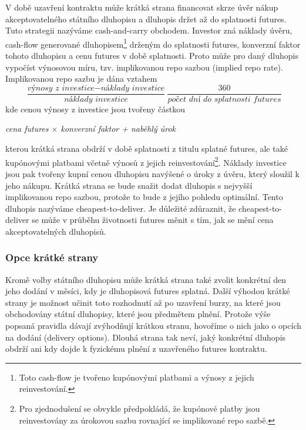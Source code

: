 \documentclass[a4paper]{book}
\begin{document}
V době uzavření kontraktu může krátká strana financovat skrze úvěr nákup akceptovatelného státního dluhopisu a dluhopis držet až do splatnosti futures. Tuto strategii nazýváme cash-and-carry obchodem. Investor zná náklady úvěru, cash-flow generované dluhopisem\footnote{Toto cash-flow je tvořeno kupónovými platbami a výnosy z jejich reinvestování.} drženým do splatnosti futures, konverzní faktor tohoto dluhopisu a cenu futures v době splatnosti. Proto může pro daný dluhopis vypočíst výnosovou míru, tzv. implikovanou repo sazbou (implied repo rate). Implikovanou repo sazbu je dána vztahem
\begin{equation*}
\frac{\textit{v\'{y}nosy z investice} - \textit{n\'{a}klady investice}}{\textit{n\'{a}klady investice}} \frac{360}{\textit{po\v{c}et dn\'{i} do splatnosti futures}}
\end{equation*}
kde cenou výnosy z investice jsou tvořeny částkou
\begin{center}
\textit{cena futures $\times$ konverzní faktor + naběhlý úrok}
\end{center}
kterou krátká strana obdrží v době splatnosti z titulu splatné futures, ale také kupónovými platbami včetně výnosů z jejich reinvestování\footnote{Pro zjednodušení se obvykle předpokládá, že kupónové platby jsou reinvestovány za úrokovou sazbu rovnající se implikované repo sazbě.}. Náklady investice jsou pak tvořeny kupní cenou dluhopisu navýšené o úroky z úvěru, který sloužil k jeho nákupu. Krátká strana se bude snažit dodat dluhopis s nejvyšší implikovanou repo sazbou, protože to bude z jejího pohledu optimální. Tento dluhopis nazýváme cheapest-to-deliver. Je důležité zdůraznit, že cheapest-to-deliver se může v průběhu životnosti futures měnit s tím, jak se mění cena akceptovatelných dluhopisů.

\subsubsection{Opce krátké strany}

Kromě volby státního dluhopisu může krátká strana také zvolit konkrétní den jeho dodání v měsíci, kdy je dluhopisová futures splatná. Další výhodou krátké strany je možnost učinit toto rozhodnutí až po uzavření burzy, na které jsou obchodovány státní dluhopisy, které jsou předmětem plnění. Protože výše popsaná pravidla dávají zvýhodňují krátkou stranu, hovoříme o nich jako o opcích na dodání (delivery options). Dlouhá strana tak neví, jaký konkrétní dluhopis obdrží ani kdy dojde k fyzickému plnění z uzavřeného futures kontraktu.
\end{document}
